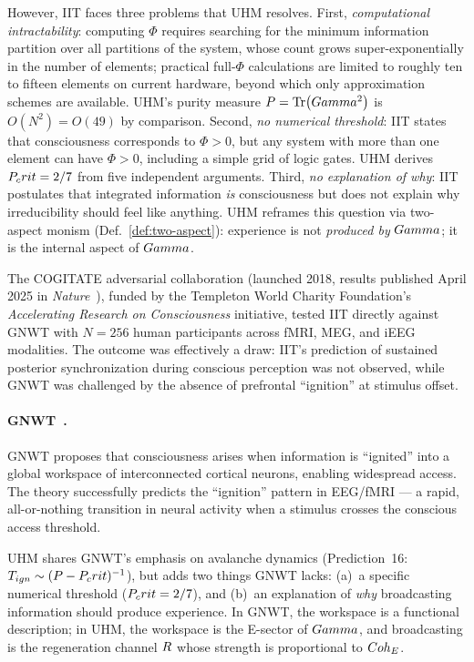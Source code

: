 However, IIT faces three problems that UHM resolves. First, \emph{computational
intractability}: computing $\Phi$ requires searching for the minimum information
partition over all partitions of the system, whose count grows super-exponentially
in the number of elements; practical full-$\Phi$ calculations are limited to roughly
ten to fifteen elements on current hardware, beyond which only approximation schemes
are available. UHM's purity measure $P = \Tr(Gamma^2)$ is $O(N^2) = O(49)$ by
comparison. Second, \emph{no numerical threshold}: IIT states that consciousness
corresponds to $\Phi > 0$, but any system with more than one element can have
$\Phi > 0$, including a simple grid of logic gates. UHM derives $P_crit = 2/7$ from
five independent arguments. Third, \emph{no explanation of why}: IIT postulates
that integrated information \emph{is} consciousness but does not explain why
irreducibility should feel like anything. UHM reframes this question via
two-aspect monism (Def.~\ref{def:two-aspect}): experience is not \emph{produced
by} $Gamma$; it is the internal aspect of $Gamma$.

The COGITATE adversarial collaboration (launched 2018, results published April 2025
in \emph{Nature}~\cite{cogitate2025}), funded by the Templeton World Charity Foundation's
\emph{Accelerating Research on Consciousness} initiative, tested IIT directly against
GNWT with $N = 256$ human participants across fMRI, MEG, and iEEG modalities. The
outcome was effectively a draw: IIT's prediction of sustained posterior synchronization
during conscious perception was not observed, while GNWT was challenged by the absence
of prefrontal ``ignition'' at stimulus offset.

\paragraph{GNWT~\cite{dehaene2011}.}
GNWT proposes that consciousness arises when information is ``ignited'' into a global
workspace of interconnected cortical neurons, enabling widespread access. The theory
successfully predicts the ``ignition'' pattern in EEG/fMRI --- a rapid, all-or-nothing
transition in neural activity when a stimulus crosses the conscious access threshold.

UHM shares GNWT's emphasis on avalanche dynamics (Prediction~16:
$T_{ign} \sim (P - P_crit)^{-1}$), but adds two things GNWT lacks: (a)~a
specific numerical threshold ($P_crit = 2/7$), and (b)~an explanation of \emph{why}
broadcasting information should produce experience. In GNWT, the workspace is a functional
description; in UHM, the workspace is the E-sector of $Gamma$, and broadcasting is the
regeneration channel $R$ whose strength is proportional to $Coh_E$.

